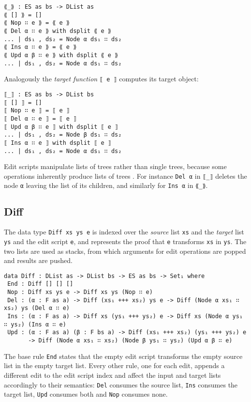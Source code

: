 \documentclass[../Thesis.tex]{subfiles}
\begin{document}
\begin{verbatim}
⟪_⟫ : ES as bs -> DList as
⟪ [] ⟫ = []
⟪ Nop ∷ e ⟫ = ⟪ e ⟫
⟪ Del α ∷ e ⟫ with dsplit ⟪ e ⟫
... | ds₁ , ds₂ = Node α ds₁ ∷ ds₂
⟪ Ins α ∷ e ⟫ = ⟪ e ⟫
⟪ Upd α β ∷ e ⟫ with dsplit ⟪ e ⟫
... | ds₁ , ds₂ = Node α ds₁ ∷ ds₂
\end{verbatim}

Analogously the \emph{target function} \texttt{⟦ e ⟧} 
computes its target object:

\begin{verbatim}
⟦_⟧ : ES as bs -> DList bs
⟦ [] ⟧ = []
⟦ Nop ∷ e ⟧ = ⟦ e ⟧
⟦ Del α ∷ e ⟧ = ⟦ e ⟧
⟦ Upd α β ∷ e ⟧ with dsplit ⟦ e ⟧
... | ds₁ , ds₂ = Node β ds₁ ∷ ds₂
⟦ Ins α ∷ e ⟧ with dsplit ⟦ e ⟧
... | ds₁ , ds₂ = Node α ds₁ ∷ ds₂
\end{verbatim}

Edit scripts manipulate lists of trees rather than single trees, because some operations inherently produce lists of trees \cite{Lemp09}.
For instance \texttt{Del α} in \texttt{⟦\_⟧} deletes the node \texttt{α} 
leaving the list of its children, and similarly for \texttt{Ins α} in \texttt{⟪\_⟫}.

	\subsection{Diff}	
	\label{subsec:Diff}
	The data type \texttt{Diff xs ys e} is indexed over the \emph{source}  list 
	\texttt{xs} and the \emph{target} list \texttt{ys} and the edit script 
	\texttt{e},  and represents the proof that \texttt{e} transforms \texttt{xs} 	in \texttt{ys}.
	The two lists are used as stacks, from which arguments for 
	edit operations are popped and results are pushed.

\begin{verbatim}
data Diff : DList as -> DList bs -> ES as bs -> Set₁ where
 End : Diff [] [] []
 Nop : Diff xs ys e -> Diff xs ys (Nop ∷ e)
 Del : (α : F as a) -> Diff (xs₁ +++ xs₂) ys e -> Diff (Node α xs₁ ∷ xs₂) ys (Del α ∷ e)
 Ins : (α : F as a) -> Diff xs (ys₁ +++ ys₂) e -> Diff xs (Node α ys₁ ∷ ys₂) (Ins α ∷ e)
 Upd : (α : F as a) (β : F bs a) -> Diff (xs₁ +++ xs₂) (ys₁ +++ ys₂) e 
       -> Diff (Node α xs₁ ∷ xs₂) (Node β ys₁ ∷ ys₂) (Upd α β ∷ e)
\end{verbatim}	

	The base rule \texttt{End} states that the empty edit script 
	transforms the empty source list in the empty target list.
	Every other rule, one for each edit, appends a different edit 
	to the edit script 	index and affect the input and target lists 
	accordingly to their 	semantics: 
	\texttt{Del} consumes the source list, \texttt{Ins} consumes the target list, 
	\texttt{Upd} consumes both and \texttt{Nop} consumes none.	
\end{document}
